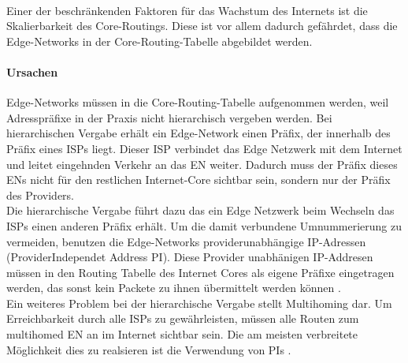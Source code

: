 \paragraph{}
Einer der beschränkenden Faktoren für das Wachstum des Internets ist die Skalierbarkeit des Core-Routings. Diese ist vor allem dadurch gefährdet, dass die Edge-Networks in der Core-Routing-Tabelle abgebildet werden.

\paragraph{Ursachen}
Edge-Networks müssen in die Core-Routing-Tabelle aufgenommen werden, weil Adresspräfixe in der Praxis nicht hierarchisch vergeben werden. Bei hierarchischen Vergabe erhält ein Edge-Network einen Präfix, der innerhalb des Präfix eines ISPs liegt. Dieser ISP verbindet das Edge Netzwerk mit dem Internet und leitet eingehnden Verkehr an das EN weiter. Dadurch muss der Präfix dieses ENs nicht für den restlichen Internet-Core sichtbar sein, sondern nur der Präfix des Providers.\\
Die hierarchische Vergabe führt dazu das ein Edge Netzwerk beim Wechseln das ISPs einen anderen Präfix erhält. Um die damit verbundene Umnummerierung zu vermeiden, benutzen die Edge-Networks providerunabhängige IP-Adressen (ProviderIndependet Address PI). Diese Provider unabhänigen IP-Addresen müssen in den Routing Tabelle des Internet Cores als eigene Präfixe eingetragen werden, das sonst kein Packete zu ihnen übermittelt werden können \cite{jen:2008:start}.\\
Ein weiteres Problem bei der hierarchische Vergabe stellt Multihoming dar. Um Erreichbarkeit durch alle ISPs zu gewährleisten, müssen alle Routen zum multihomed EN an im Internet sichtbar sein. Die am meisten verbreitete Möglichkeit dies zu realsieren ist die Verwendung von PIs \cite{jen:2008:start}.
